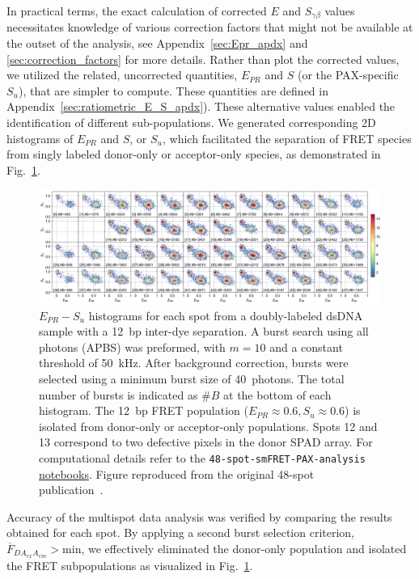 In practical terms, the exact calculation of corrected $E$ and $S_{\gamma\beta}$ values necessitates knowledge of various correction factors that might not be available at the outset of the analysis, see Appendix~\ref{sec:Epr_apdx} and \ref{sec:correction_factors} for more details. 
Rather than plot the corrected values, we utilized the related, uncorrected quantities, $E_{PR}$ and $S$ (or the \ac{PAX}-specific $S_u$), that are simpler to compute.
These quantities are defined in Appendix~\ref{sec:ratiometric_E_S_apdx}). 
These alternative values enabled the identification of different sub-populations. 
We generated corresponding 2D histograms of $E_{PR}$ and $S$, or $S_u$, which facilitated the separation of FRET species from singly labeled donor-only or acceptor-only species, as demonstrated in Fig.~\ref{fig:48-spot_FRET_pop}.

\begin{figure}
\centering\includegraphics[width=1.0\linewidth]{chapters/figures/2017-05-23_08_12d_48spot_alex_hist_Su_all-bursts.png}
\caption{\label{fig:48-spot_FRET_pop} $E_{PR} - S_u$ histograms for each 
spot from a doubly-labeled \ac{dsDNA} sample with a 12~\ac{bp} inter-dye separation. 
A burst search using all photons (\ac{APBS}) was preformed, with $m=10$ and a constant threshold of 50~kHz.
After background correction, bursts were selected using a minimum burst size of 40~photons.
The total number of bursts is indicated as $\#B$ at the bottom of each histogram.  
The 12~\ac{bp} FRET population ($E_{PR} \approx 0.6, S_u \approx 0.6$) is isolated from donor-only or acceptor-only populations.
Spots 12 and 13 correspond to two defective pixels in the donor \ac{SPAD} array.
For computational details refer to the \texttt{48-spot-smFRET-PAX-analysis}  
\href{https://github.com/tritemio/48-spot-smFRET-PAX-analysis}{notebooks}.
Figure reproduced from the original 48-spot publication~\cite{ingargiola_JCP_2018}.
}
\end{figure}

Accuracy of the multispot data analysis was verified by comparing the results obtained for each spot. 
By applying a second burst selection criterion, $\overline{F}_{DA_{ex}A_{em}} > \text{min}$, we effectively eliminated the donor-only population and isolated the FRET subpopulations as visualized in Fig.~\ref{fig:48-spot_FRET_pop}. 

